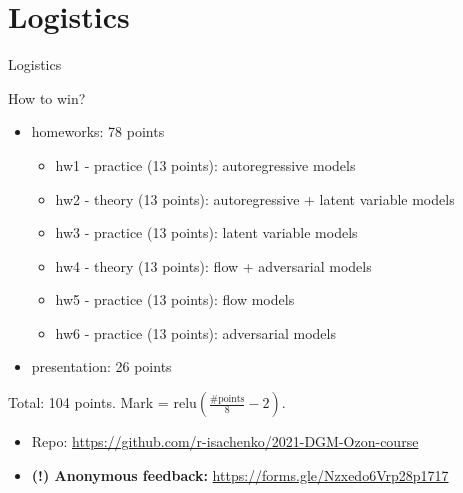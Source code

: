 

\begin{frame}
\titlepage
\end{frame}
\section{Logistics}
\begin{frame}{Logistics}
	\begin{block}{How to win?}
    \begin{itemize}
        \item homeworks: 78 points
        \begin{itemize}
            \item hw1 - practice (13 points): autoregressive models 
            \item hw2 - theory (13 points): autoregressive + latent variable models 
            \item hw3 - practice (13 points): latent variable models 
            \item hw4 - theory (13 points): flow + adversarial models 
            \item hw5 - practice (13 points): flow models
            \item hw6 - practice (13 points): adversarial models
        \end{itemize}
        \item presentation: 26 points
    \end{itemize}
    Total: 104 points. Mark = $\text{relu}\left(\frac{\# \text{points}}{8} - 2 \right)$.
    \end{block}
    \begin{itemize}
    	\item Repo: \href{https://github.com/r-isachenko/2021-DGM-Ozon-course}{https://github.com/r-isachenko/2021-DGM-Ozon-course} \\
    	\item \textbf{(!) Anonymous feedback:} \href{https://forms.gle/Nzxedo6Vrp28p1717}{https://forms.gle/Nzxedo6Vrp28p1717}
    \end{itemize}
\end{frame}
